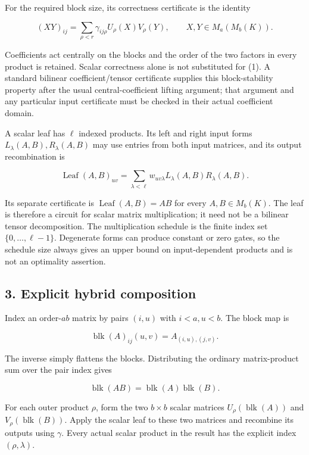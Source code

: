 \documentclass[
  11pt,
]{article}
\begin{document}
For the required block size, its correctness certificate is the identity

\[
(XY)_{ij}=\sum_{\rho<r}\gamma_{ij\rho}U_\rho(X)V_\rho(Y),
\qquad X,Y\in M_a(M_b(K)).
\tag{1}
\]

Coefficients act centrally on the blocks and the order of the two
factors in every product is retained. Scalar correctness alone is not
substituted for (1). A standard bilinear coefficient/tensor certificate
supplies this block-stability property after the usual
central-coefficient lifting argument; that argument and any particular
input certificate must be checked in their actual coefficient domain.

A scalar leaf has \(\ell\) indexed products. Its left and right input
forms \(L_\lambda(A,B),R_\lambda(A,B)\) may use entries from both input
matrices, and its output recombination is

\[
\operatorname{Leaf}(A,B)_{uv}
=\sum_{\lambda<\ell}w_{uv\lambda}
L_\lambda(A,B)R_\lambda(A,B).
\tag{2}
\]

Its separate certificate is \(\operatorname{Leaf}(A,B)=AB\) for every
\(A,B\in M_b(K)\). The leaf is therefore a circuit for scalar matrix
multiplication; it need not be a bilinear tensor decomposition. The
multiplication schedule is the finite index set \(\{0,\ldots,\ell-1\}\).
Degenerate forms can produce constant or zero gates, so the schedule
size always gives an upper bound on input-dependent products and is not
an optimality assertion.

\subsection{3. Explicit hybrid
composition}\label{explicit-hybrid-composition}

Index an order-\(ab\) matrix by pairs \((i,u)\) with \(i<a,u<b\). The
block map is

\[
\operatorname{blk}(A)_{ij}(u,v)=A_{(i,u),(j,v)}.
\tag{3}
\]

The inverse simply flattens the blocks. Distributing the ordinary
matrix-product sum over the pair index gives

\[
\operatorname{blk}(AB)=\operatorname{blk}(A)\operatorname{blk}(B).
\tag{4}
\]

For each outer product \(\rho\), form the two \(b\times b\) scalar
matrices \(U_\rho(\operatorname{blk}(A))\) and
\(V_\rho(\operatorname{blk}(B))\). Apply the scalar leaf to these two
matrices and recombine its outputs using \(\gamma\). Every actual scalar
product in the result has the explicit index \((\rho,\lambda)\).
\end{document}
